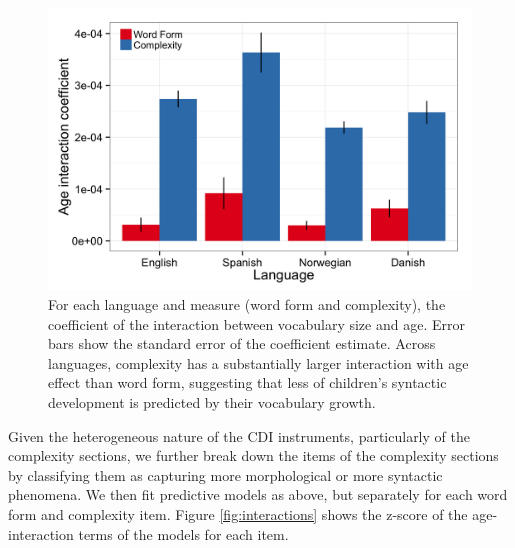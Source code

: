 \documentclass[10pt,letterpaper]{article}
\begin{document}
\begin{figure}[t]
\begin{center}
\includegraphics[width=\linewidth]{plots/coefs_wordform_complexity.png}
\end{center}
\caption{\label{fig:coefs_grammar}  For each language and measure (word form and complexity), the coefficient of the interaction between vocabulary size and age. Error bars show the standard error of the coefficient estimate. Across languages, complexity has a substantially larger interaction with age effect than word form, suggesting that less of children's syntactic development is predicted by their vocabulary growth.} 
\end{figure}

Given the heterogeneous nature of the CDI instruments, particularly of the complexity sections, we further break down the items of the complexity sections by classifying them as capturing more morphological or more syntactic phenomena. We then fit predictive models as above, but separately for each word form and complexity item. Figure \ref{fig:interactions} shows the z-score of the age-interaction terms of the models for each item. 
\end{document}
